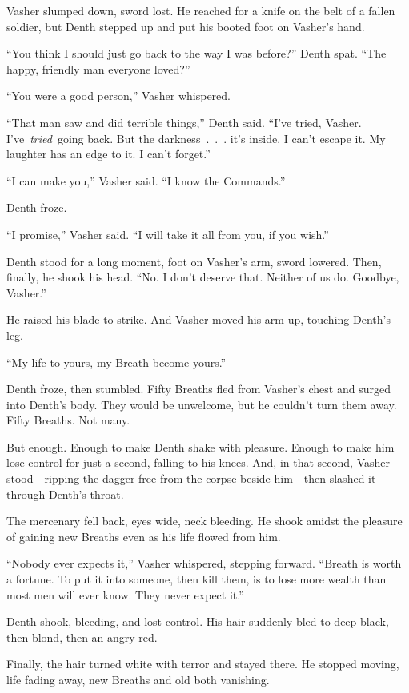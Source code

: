 Vasher slumped down, sword lost. He reached for a knife on the belt of a fallen soldier, but Denth stepped up and put his booted foot on Vasher’s hand.

“You think I should just go back to the way I was before?” Denth spat. “The happy, friendly man everyone loved?”

“You were a good person,” Vasher whispered.

“That man saw and did terrible things,” Denth said. “I’ve tried, Vasher. I’ve~\textit{tried}~going back. But the darkness~.~.~. it’s inside. I can’t escape it. My laughter has an edge to it. I can’t forget.”

“I can make you,” Vasher said. “I know the Commands.”

Denth froze.

“I promise,” Vasher said. “I will take it all from you, if you wish.”

Denth stood for a long moment, foot on Vasher’s arm, sword lowered. Then, finally, he shook his head. “No. I don’t deserve that. Neither of us do. Goodbye, Vasher.”

He raised his blade to strike. And Vasher moved his arm up, touching Denth’s leg.

“My life to yours, my Breath become yours.”

Denth froze, then stumbled. Fifty Breaths fled from Vasher’s chest and surged into Denth’s body. They would be unwelcome, but he couldn’t turn them away. Fifty Breaths. Not many.

But enough. Enough to make Denth shake with pleasure. Enough to make him lose control for just a second, falling to his knees. And, in that second, Vasher stood—ripping the dagger free from the corpse beside him—then slashed it through Denth’s throat.

The mercenary fell back, eyes wide, neck bleeding. He shook amidst the pleasure of gaining new Breaths even as his life flowed from him.

“Nobody ever expects it,” Vasher whispered, stepping forward. “Breath is worth a fortune. To put it into someone, then kill them, is to lose more wealth than most men will ever know. They never expect it.”

Denth shook, bleeding, and lost control. His hair suddenly bled to deep black, then blond, then an angry red.

Finally, the hair turned white with terror and stayed there. He stopped moving, life fading away, new Breaths and old both vanishing.

